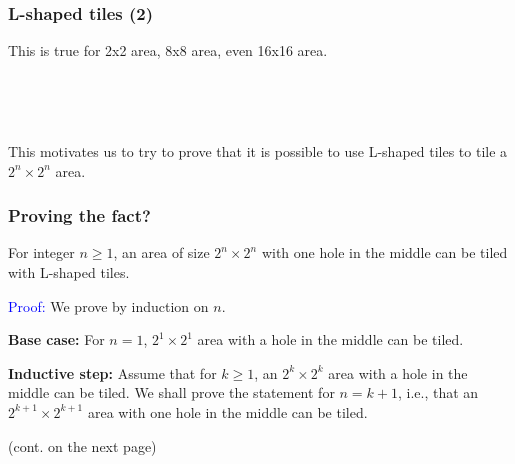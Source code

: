 \begin{frame}\frametitle{L-shaped tiles (2)}
  This is true for 2x2 area, 8x8 area, even 16x16 area.
  \vspace{0.1in}

  \ \ 
  \ \
  
  \vspace{0.1in}

  This motivates us to try to prove that it is possible to use
  L-shaped tiles to tile a $2^n\times 2^n$ area.
\end{frame}

\begin{frame}\frametitle{Proving the fact?}
  \begin{theorem}
    For integer $n\geq 1$, an area of size $2^n\times 2^n$ with one
    hole in the middle can be tiled with L-shaped tiles.
  \end{theorem}
  \textcolor{blue}{Proof:}  We prove by induction on $n$.
  
  {\bf Base case:} For $n=1$, $2^1\times 2^1$ area with a hole in
  the middle can be tiled.

  {\bf Inductive step:} Assume that for $k\geq 1$, an $2^k\times
  2^k$ area with a hole in the middle can be tiled.  We shall prove
  the statement for $n=k+1$, i.e., that an $2^{k+1}\times 2^{k+1}$
  area with one hole in the middle can be tiled.
  
  (cont. on the next page)
\end{frame}

